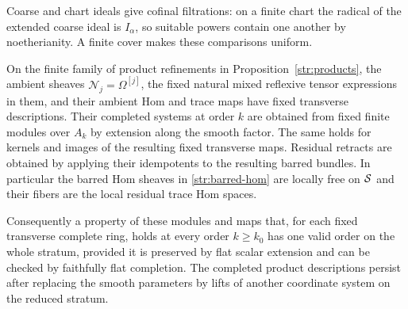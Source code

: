 Coarse and chart ideals give cofinal filtrations: on a finite chart
the radical of the extended coarse ideal is $I_\alpha$, so suitable
powers contain one another by noetherianity.  A finite cover makes
these comparisons uniform.

\begin{lemma}\label{str:uniform}
On the finite family of product refinements in
Proposition~\ref{str:products}, the ambient sheaves
$\mathcal N_j=\Omega^{[j]}$, the fixed natural mixed reflexive tensor
expressions in them, and their ambient Hom and trace maps have fixed
transverse descriptions.  Their completed systems at order $k$ are
obtained from fixed finite modules over $A_k$ by extension along the
smooth factor.  The same holds for kernels and images of the resulting
fixed transverse maps.  Residual retracts are obtained by applying
their idempotents to the resulting barred bundles.  In particular the barred Hom sheaves in
\eqref{str:barred-hom} are locally free on $\mathcal S$ and their fibers are
the local residual trace Hom spaces.

Consequently a property of these modules and maps that, for each fixed
transverse complete ring, holds at every order $k\geq k_0$ has one
valid order on the whole stratum, provided it is preserved by flat
scalar extension and can be checked by faithfully flat completion.
The completed product descriptions persist after replacing the smooth
parameters by lifts of another coordinate system on the reduced
stratum.
\end{lemma}

